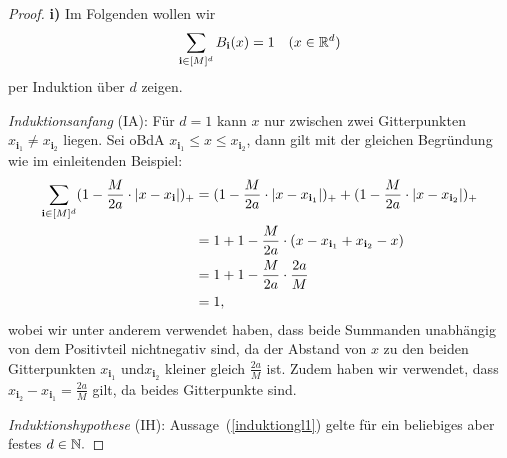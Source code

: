 \begin{proof}
\textbf{i)} Im Folgenden wollen wir 
\begin{equation}
\label{induktiongl1}
\sum_{\mathbf{i} \in [M]^d} B_{\mathbf{i}}(x) = 1 \quad (x \in \mathbb{R}^d)
\end{equation}
per Induktion über $d$ zeigen. 
	
	 \emph{Induktionsanfang} (IA): Für $d = 1$ kann $x$ nur zwischen zwei Gitterpunkten $x_{\mathbf{i}_1} \neq x_{\mathbf{i}_2}$ liegen. Sei oBdA $x_{\mathbf{i}_1}\leq x \leq x_{\mathbf{i}_2}$, dann gilt mit der gleichen Begründung wie im einleitenden Beispiel:
	\begin{equation*}
	\begin{split}
	\sum_{\mathbf{i} \in [M]^d} (1 - \frac{M}{2a} \cdot |x - x_{\mathbf{i}}|)_+ & = (1 - \frac{M}{2a} \cdot |x - x_{\mathbf{i}_1}|)_+ + (1 - \frac{M}{2a} \cdot |x - x_{\mathbf{i}_2}|)_+ \\
	& = 1 + 1 - \frac{M}{2a} \cdot (x - x_{\mathbf{i}_1} + x_{\mathbf{i}_2} - x) \\
	& = 1 + 1 - \frac{M}{2a} \cdot \frac{2a}{M} \\
	& = 1,
	\end{split}
	\end{equation*} wobei wir unter anderem verwendet haben, dass beide Summanden unabhängig von dem Positivteil nichtnegativ sind, da der Abstand von $x$ zu den beiden Gitterpunkten $x_{\mathbf{i}_1}$ und$ x_{\mathbf{i}_2}$ kleiner gleich $\frac{2a}{M}$ ist. Zudem haben wir verwendet, dass $x_{\mathbf{i}_2} - x_{\mathbf{i}_1} = \frac{2a}{M}$ gilt, da beides Gitterpunkte sind.     
	
\emph{Induktionshypothese} (IH): Aussage~(\ref{induktiongl1}) gelte für ein beliebiges aber festes $d \in \mathbb{N}.$


\end{proof}
